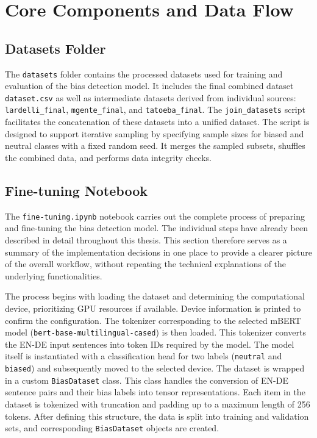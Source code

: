 \section{Core Components and Data Flow}
    \subsection{Datasets Folder}
        The \texttt{datasets} folder contains the processed datasets used for training and evaluation of the bias detection model. It includes the final combined dataset \texttt{dataset.csv} as well as intermediate datasets derived from individual sources: \texttt{lardelli\_final}, \texttt{mgente\_final}, and \texttt{tatoeba\_final}. The \texttt{join\_datasets} script facilitates the concatenation of these datasets into a unified dataset. The script is designed to support iterative sampling by specifying sample sizes for biased and neutral classes with a fixed random seed. It merges the sampled subsets, shuffles the combined data, and performs data integrity checks. 

  
    \subsection{Fine-tuning Notebook}
        The \texttt{fine-tuning.ipynb} notebook carries out the complete process of preparing and fine-tuning the bias detection model. The individual steps have already been described in detail throughout this thesis. This section therefore serves as a summary of the implementation decisions in one place to provide a clearer picture of the overall workflow, without repeating the technical explanations of the underlying functionalities.  

        The process begins with loading the dataset and determining the computational device, prioritizing GPU resources if available. Device information is printed to confirm the configuration. The tokenizer corresponding to the selected mBERT model (\texttt{bert-base-multilingual-cased}) is then loaded. This tokenizer converts the EN-DE input sentences into token IDs required by the model. The model itself is instantiated with a classification head for two labels (\texttt{neutral} and \texttt{biased}) and subsequently moved to the selected device. The dataset is wrapped in a custom \texttt{BiasDataset} class. This class handles the conversion of EN-DE sentence pairs and their bias labels into tensor representations. Each item in the dataset is tokenized with truncation and padding up to a maximum length of 256 tokens. After defining this structure, the data is split into training and validation sets, and corresponding \texttt{BiasDataset} objects are created.  

